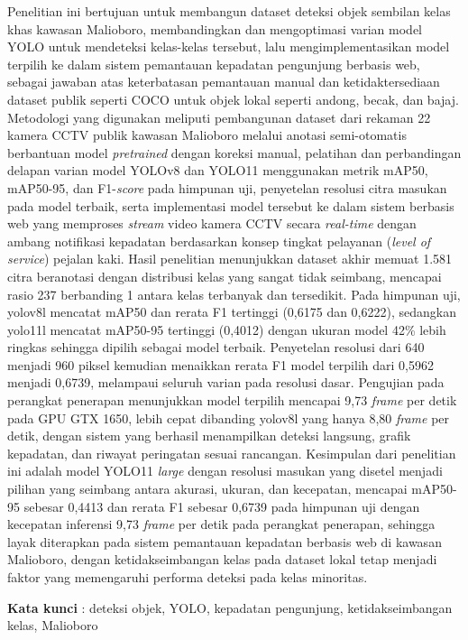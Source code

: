 Penelitian ini bertujuan untuk membangun dataset deteksi objek sembilan 
kelas khas kawasan Malioboro, membandingkan dan mengoptimasi varian model 
YOLO untuk mendeteksi kelas-kelas tersebut, lalu mengimplementasikan model 
terpilih ke dalam sistem pemantauan kepadatan pengunjung berbasis web, 
sebagai jawaban atas keterbatasan pemantauan manual dan ketidaktersediaan 
dataset publik seperti COCO untuk objek lokal seperti andong, becak, dan 
bajaj. Metodologi yang digunakan meliputi pembangunan dataset dari rekaman 
22 kamera CCTV publik kawasan Malioboro melalui anotasi semi-otomatis 
berbantuan model \textit{pretrained} dengan koreksi manual, pelatihan dan 
perbandingan delapan varian model YOLOv8 dan YOLO11 menggunakan metrik 
mAP50, mAP50-95, dan F1-\textit{score} pada himpunan uji, penyetelan 
resolusi citra masukan pada model terbaik, serta implementasi model 
tersebut ke dalam sistem berbasis web yang memproses \textit{stream} video 
kamera CCTV secara \textit{real-time} dengan ambang notifikasi kepadatan 
berdasarkan konsep tingkat pelayanan (\textit{level of service}) pejalan 
kaki. Hasil penelitian menunjukkan dataset akhir memuat 1.581 citra 
beranotasi dengan distribusi kelas yang sangat tidak seimbang, mencapai 
rasio 237 berbanding 1 antara kelas terbanyak dan tersedikit. Pada himpunan 
uji, yolov8l mencatat mAP50 dan rerata F1 tertinggi (0,6175 dan 0,6222), 
sedangkan yolo11l mencatat mAP50-95 tertinggi (0,4012) dengan ukuran model 
42\% lebih ringkas sehingga dipilih sebagai model terbaik. Penyetelan 
resolusi dari 640 menjadi 960 piksel kemudian menaikkan rerata F1 model 
terpilih dari 0,5962 menjadi 0,6739, melampaui seluruh varian pada resolusi 
dasar. Pengujian pada perangkat penerapan menunjukkan model terpilih 
mencapai 9,73 \textit{frame} per detik pada GPU GTX 1650, lebih cepat 
dibanding yolov8l yang hanya 8,80 \textit{frame} per detik, dengan sistem 
yang berhasil menampilkan deteksi langsung, grafik kepadatan, dan riwayat 
peringatan sesuai rancangan. Kesimpulan dari penelitian ini adalah model YOLO11 \textit{large} dengan resolusi masukan 
yang disetel menjadi pilihan yang seimbang antara akurasi, ukuran, dan kecepatan, mencapai 
mAP50-95 sebesar 0,4413 dan rerata F1 sebesar 0,6739 pada himpunan uji dengan kecepatan 
inferensi 9,73 \textit{frame} per detik pada perangkat penerapan, sehingga layak diterapkan 
pada sistem pemantauan kepadatan berbasis web di kawasan 
Malioboro, dengan ketidakseimbangan kelas pada dataset lokal tetap menjadi 
faktor yang memengaruhi performa deteksi pada kelas minoritas.

\noindent\textbf{Kata kunci} : deteksi objek, YOLO, kepadatan pengunjung, ketidakseimbangan kelas, Malioboro